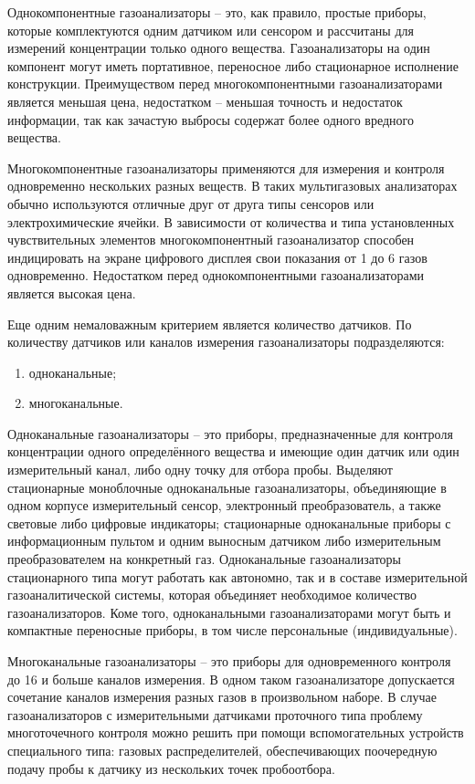 \documentclass[14pt, a4paper]{extreport}
\begin{document}
	Однокомпонентные газоанализаторы -- это, как правило, простые приборы, которые комплектуются одним датчиком или сенсором и рассчитаны для измерений концентрации только одного вещества. Газоанализаторы на один компонент могут иметь портативное, переносное либо стационарное исполнение конструкции. Преимуществом перед многокомпонентными газоанализаторами является меньшая цена, недостатком -- меньшая точность и недостаток информации, так как зачастую выбросы содержат более одного вредного вещества.
	
	Многокомпонентные газоанализаторы применяются для измерения и контроля одновременно нескольких разных веществ. В таких мультигазовых анализаторах обычно используются отличные друг от друга типы сенсоров или электрохимические ячейки. В зависимости от количества и типа установленных чувствительных элементов многокомпонентный газоанализатор способен индицировать на экране цифрового дисплея свои показания от 1 до 6 газов одновременно. Недостатком перед однокомпонентными газоанализаторами является высокая цена.
	
	Еще одним немаловажным критерием является количество датчиков. По количеству датчиков или каналов измерения газоанализаторы подразделяются:
	\begin{enumerate}[label={\arabic*)}]
		\item одноканальные;
		\item многоканальные.
	\end{enumerate}
	
	Одноканальные газоанализаторы -- это приборы, предназначенные для контроля концентрации одного определённого вещества и имеющие один датчик или один измерительный канал, либо одну точку для отбора пробы. Выделяют стационарные моноблочные одноканальные газоанализаторы, объединяющие в одном корпусе измерительный сенсор, электронный преобразователь, а также световые либо цифровые индикаторы; стационарные одноканальные приборы с информационным пультом и одним выносным датчиком либо измерительным преобразователем на конкретный газ. Одноканальные газоанализаторы стационарного типа могут работать как автономно, так и в составе измерительной газоаналитической системы, которая объединяет необходимое количество газоанализаторов. Коме того, одноканальными газоанализаторами могут быть и компактные переносные приборы, в том числе персональные (индивидуальные).
	
	Многоканальные газоанализаторы -- это приборы для одновременного контроля до 16 и больше каналов измерения. В одном таком газоанализаторе допускается сочетание каналов измерения разных газов в произвольном наборе. В случае газоанализаторов с измерительными датчиками проточного типа проблему многоточечного контроля можно решить при помощи вспомогательных устройств специального типа: газовых распределителей, обеспечивающих поочередную подачу пробы к датчику из нескольких точек пробоотбора. 
	
\end{document}
